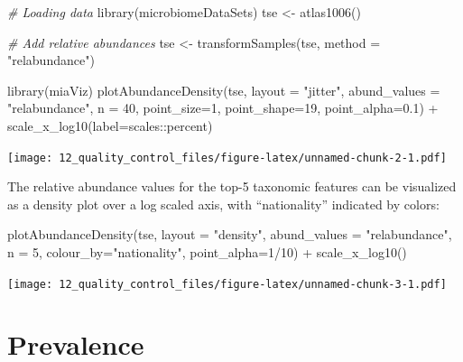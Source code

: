 \documentclass[
]{book}
\newenvironment{Shaded}{\begin{snugshade}}{\end{snugshade}}
\newcommand{\AttributeTok}[1]{\textcolor[rgb]{0.77,0.63,0.00}{#1}}
\newcommand{\CommentTok}[1]{\textcolor[rgb]{0.56,0.35,0.01}{\textit{#1}}}
\newcommand{\DecValTok}[1]{\textcolor[rgb]{0.00,0.00,0.81}{#1}}
\newcommand{\FloatTok}[1]{\textcolor[rgb]{0.00,0.00,0.81}{#1}}
\newcommand{\FunctionTok}[1]{\textcolor[rgb]{0.00,0.00,0.00}{#1}}
\newcommand{\NormalTok}[1]{#1}
\newcommand{\OtherTok}[1]{\textcolor[rgb]{0.56,0.35,0.01}{#1}}
\newcommand{\SpecialCharTok}[1]{\textcolor[rgb]{0.00,0.00,0.00}{#1}}
\newcommand{\StringTok}[1]{\textcolor[rgb]{0.31,0.60,0.02}{#1}}
\begin{document}
\begin{Shaded}
\begin{Highlighting}[]
\CommentTok{\# Loading data}
\FunctionTok{library}\NormalTok{(microbiomeDataSets)}
\NormalTok{tse }\OtherTok{\textless{}{-}} \FunctionTok{atlas1006}\NormalTok{()}

\CommentTok{\# Add relative abundances}
\NormalTok{tse }\OtherTok{\textless{}{-}} \FunctionTok{transformSamples}\NormalTok{(tse, }\AttributeTok{method =} \StringTok{"relabundance"}\NormalTok{)}

\FunctionTok{library}\NormalTok{(miaViz)}
\FunctionTok{plotAbundanceDensity}\NormalTok{(tse, }\AttributeTok{layout =} \StringTok{"jitter"}\NormalTok{, }\AttributeTok{abund\_values =} \StringTok{"relabundance"}\NormalTok{,}
                     \AttributeTok{n =} \DecValTok{40}\NormalTok{, }\AttributeTok{point\_size=}\DecValTok{1}\NormalTok{, }\AttributeTok{point\_shape=}\DecValTok{19}\NormalTok{, }\AttributeTok{point\_alpha=}\FloatTok{0.1}\NormalTok{) }\SpecialCharTok{+} 
    \FunctionTok{scale\_x\_log10}\NormalTok{(}\AttributeTok{label=}\NormalTok{scales}\SpecialCharTok{::}\NormalTok{percent)}
\end{Highlighting}
\end{Shaded}

\texttt{[image: 12\_quality\_control\_files/figure-latex/unnamed-chunk-2-1.pdf]}

The relative abundance values for the top-5 taxonomic features can be
visualized as a density plot over a log scaled axis, with
``nationality'' indicated by colors:

\begin{Shaded}
\begin{Highlighting}[]
\FunctionTok{plotAbundanceDensity}\NormalTok{(tse, }\AttributeTok{layout =} \StringTok{"density"}\NormalTok{, }\AttributeTok{abund\_values =} \StringTok{"relabundance"}\NormalTok{,}
                     \AttributeTok{n =} \DecValTok{5}\NormalTok{, }\AttributeTok{colour\_by=}\StringTok{"nationality"}\NormalTok{, }\AttributeTok{point\_alpha=}\DecValTok{1}\SpecialCharTok{/}\DecValTok{10}\NormalTok{) }\SpecialCharTok{+}
    \FunctionTok{scale\_x\_log10}\NormalTok{()}
\end{Highlighting}
\end{Shaded}

\texttt{[image: 12\_quality\_control\_files/figure-latex/unnamed-chunk-3-1.pdf]}

\hypertarget{prevalence}{%
\section{Prevalence}\label{prevalence}}
\end{document}
